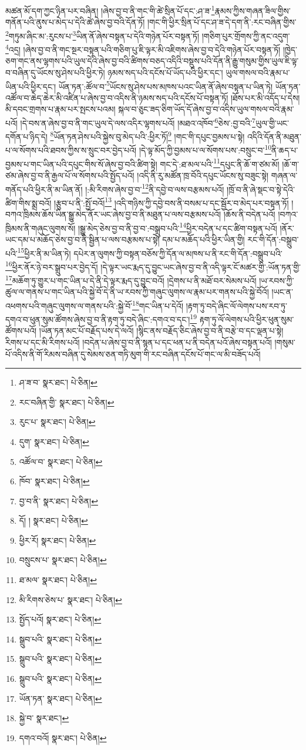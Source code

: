 མཚན་མོ་དག་ཀྱང་ཉིན་པར་བཞིན། །ཞེས་བྱ་བ་ནི་གང་གི་ཚེ་སྲིན་པོ་དང་:ཤ་ཟ་\footnote{ཤ་ཟ་བ་  སྣར་ཐང་།  པེ་ཅིན། }རྣམས་ཀྱིས་གཞན་ཟིལ་གྱིས་གནོན་པའི་ནུས་པ་མེད་པ་དེའི་ཚེ་ཞེས་བྱ་བའི་དོན་ཏོ། །གང་གི་ཕྱིར་སྲིན་པོ་དང་ཤ་ཟ་དེ་དག་ནི་:རང་བཞིན་གྱིས་\footnote{རང་བཞིན་གྱི་  སྣར་ཐང་།  པེ་ཅིན། }གཏུམ་ཞིང་མ་:རུངས་པ་\footnote{རུང་པ་  སྣར་ཐང་།  པེ་ཅིན། }ཡིན་ནོ་ཞེས་བསྟན་པ་དེའི་གཉེན་པོར་བསྟན་ཏོ། །གཅིག་པུར་གྲོགས་ཀྱི་ནང་འདུག་\footnote{དུག་  སྣར་ཐང་།  པེ་ཅིན། }འདྲ། །ཞེས་བྱ་བ་ནི་གང་སྔར་བསྟན་པའི་གཅིག་པུ་ཇི་ལྟར་མི་འཇིགས་ཞེས་བྱ་བ་དེའི་གཉེན་པོར་བསྟན་ཏོ། །ཁྱེད་ཅག་གང་ནས་ལྷགས་པའི་ཡུལ་དེའི་ཞེས་བྱ་བའི་ཚིགས་བཅད་འདིའི་བསྡུས་པའི་དོན་ནི་རྒྱུ་གསུམ་གྱིས་ཡུལ་ཇི་ལྟ་བ་བཞིན་དུ་ཡོངས་སུ་ཤེས་པའི་ཕྱིར་ཏེ། ཉམས་སད་པའི་དངོས་པོ་ཡོད་པའི་ཕྱིར་དང་། ཡུལ་གསལ་བའི་རྣམ་པ་ཡིན་པའི་ཕྱིར་དང་། ཡོན་ཏན་:ཚོལ་བ་\footnote{འཚོལ་བ་  སྣར་ཐང་།  པེ་ཅིན། }ཡོངས་སུ་ཤེས་པས་མཁས་པའང་ཡིན་ནོ་ཞེས་བསྟན་པ་ཡིན་ཏེ། ཡོན་ཏན་འཚོལ་བ་ཆེད་ཆེར་མི་འཛིན་པ་ཞེས་བྱ་བ་འདིས་ནི་ཉམས་སད་པའི་དངོས་པོ་བསྟན་ཏོ། །ཐོས་པར་མི་འདོད་པ་དེས། མི་དབང་གྲགས་པ་རྣམ་པར་སྤངས་པའམ། སྐལ་བ་ཅུང་ཟད་ཅིག་ཡོད་དོ་ཞེས་བྱ་བ་འདིས་ཡུལ་གསལ་བའི་རྣམ་པའོ། །དེ་བས་ན་ཞེས་བྱ་བ་ནི་གང་ཡུལ་དེ་ལས་འདིར་ལྷགས་པའོ། །མཐའ་འཁོབ་\footnote{ཁོབ་  སྣར་ཐང་།  པེ་ཅིན། }ཅེས་:བྱ་བའི་\footnote{བྱ་བ་ནི་  སྣར་ཐང་།  པེ་ཅིན། }ཡུལ་གྱི་ཡང་དགོན་པ་ཉིད་དེ། \footnote{དོ། །   སྣར་ཐང་།  པེ་ཅིན། }ཡོན་ཏན་ཤེས་པའི་སྐྱེས་བུ་མེད་པའི་:ཕྱིར་ཏོ།\footnote{ཕྱིར་རོ།  སྣར་ཐང་།  པེ་ཅིན། } །གང་གི་དཔུང་བྱམས་པ་སྟེ། འདིའི་དོན་ནི་མཐུན་པ་ལ་སོགས་པའི་ཐབས་ཀྱིས་ས་སྲུང་བར་བྱེད་པའོ། །དེ་ལྟ་མོད་ཀྱི་བྱམས་པ་ལ་སོགས་པས་:བསྲུང་བ་\footnote{བསྲུངས་པ་  སྣར་ཐང་།  པེ་ཅིན། }ནི་ཆད་པ་བྱམས་པ་གང་ཡིན་པའི་དཔུང་གིས་སོ་ཞེས་བྱ་བའི་ཚིག་སྟེ། གང་དེ་:ཐ་མལ་པའི་\footnote{ཐ་མལ་  སྣར་ཐང་།  པེ་ཅིན། }དཔུང་ནི་ཆོ་ག་ཙམ་མོ། །ཆོ་ག་ཙམ་ཞེས་བྱ་བ་ནི་རྒྱལ་པོ་ལ་སོགས་པའི་སྤྱོད་པའོ། །འདི་ནི་རུ་མཚོན་ཁྲ་བོའི་དཔུང་ཡོངས་སུ་བཟུང་སྟེ། གཞན་ལ་གནོད་པའི་ཕྱིར་ནི་མ་ཡིན་ནོ། །:མི་རིགས་ཞེས་བྱ་བ་\footnote{མི་རིགས་ཅེས་པ་  སྣར་ཐང་།  པེ་ཅིན། }ནི་དབྱེ་བ་ལས་བརྩམས་པའོ། །ཁྲོ་བ་ནི་ཞེ་སྡང་བ་སྟེ་དེའི་ཚིག་གིས་སྨྲ་བའོ། །རྩུབ་པ་ནི་:སྤྱོ་བའོ།\footnote{སྤྱོད་པའོ།  སྣར་ཐང་།  པེ་ཅིན། } །འདི་གཉིས་ཀྱི་དབྱེ་བས་ནི་བསམ་པ་དང་སྦྱོར་བ་མེད་པར་བསྟན་ཏོ། །བཀའ་ཁྲིམས་ཆོས་ཡིན་སྒྱུ་མེད་ནོར་ཡང་ཞེས་བྱ་བ་ནི་མཐུན་པ་ལས་བརྩམས་པའོ། །ཆོས་ནི་བདེན་པའོ། །བཀའ་ཁྲིམས་ནི་གཞུང་ལུགས་སོ། །སྒྱུ་མེད་ཅེས་བྱ་བ་ནི་བྱ་བ་:བསྒྲུབ་པའི་\footnote{སྒྲུབ་པའི་  སྣར་ཐང་།  པེ་ཅིན། }ཕྱིར་བདེན་པ་དང་ཚིག་བསྟན་པའོ། །ནོར་ཡང་དམ་པ་མཆོད་ཅེས་བྱ་བ་ནི་སྦྱིན་པ་ལས་བརྩམས་པ་སྟེ། དམ་པ་མཆོད་པའི་ཕྱིར་ཡིན་གྱི། རང་གི་དོན་:བསྒྲུབ་པའི་\footnote{སྒྲུབ་པའི་  སྣར་ཐང་།  པེ་ཅིན། }ཕྱིར་ནི་མ་ཡིན་ཏེ། དཔེར་ན་ལུགས་ཀྱི་བསྟན་བཅོས་ཀྱི་དོན་ལ་མཁས་པ་ནི་རང་གི་དོན་:བསྒྲུབ་པའི་\footnote{སྒྲུབ་པའི་  སྣར་ཐང་།  པེ་ཅིན། }ཕྱིར་ནོར་ཉེ་བར་སྒྲུབ་པར་བྱེད་དོ། །དེ་ལྟར་ཡང་རྨད་དུ་བྱུང་ཡང་ཞེས་བྱ་བ་ནི་འདི་ལྟར་ངོ་མཚར་གྱི་:ཡོན་ཏན་གྱི་\footnote{ཡོན་ཏན་  སྣར་ཐང་།  པེ་ཅིན། }མཆོག་ཏུ་གྱུར་པ་གང་ཡིན་པ་དེ་ནི་དེ་ལྟར་རྨད་དུ་བྱུང་བའོ། །དྲེགས་པ་ནི་མཐོ་བར་སེམས་པའོ། །ཡ་རབས་ཀྱི་ཚུལ་ལ་གནས་པ་གང་ཡིན་པའི་སྐྱེ་བོ་དེ་ནི་ཡ་རབས་ཀྱི་གཞུང་ལུགས་ལ་རྣམ་པར་གནས་པའི་སྐྱེ་བོའོ། །ཡང་ན་འཕགས་པའི་གཞུང་ལུགས་ལ་གནས་པའི་:སྐྱེ་བོ་\footnote{སྐྱེ་བ་  སྣར་ཐང་། }གང་ཡིན་པ་དེའོ། །རྟག་ཏུ་བདེ་ཞིང་ལོ་ལེགས་པས་རབ་ཏུ་དགའ་བ་ཕུན་སུམ་ཚོགས་ཞེས་བྱ་བ་ནི་རྟག་ཏུ་བདེ་ཞིང་:དགའ་བ་དང་།\footnote{དགའ་བའོ།  སྣར་ཐང་།  པེ་ཅིན། } རྟག་ཏུ་ལོ་ལེགས་པའི་ཕྱིར་ཕུན་སུམ་ཚོགས་པའོ། །ཡོན་ཏན་མང་པོ་བརྗོད་པས་དེ་ལའོ། །སྙིང་ནས་བརྗོད་ཅིང་ཞེས་བྱ་བ་ནི་བརྩེ་བ་དང་ལྡན་པ་སྟེ། རིགས་པ་དང་མི་རིགས་པའོ། །བདེན་པ་ཞེས་བྱ་བ་ནི་སྙན་པ་དང་ཕན་པ་ནི་བདེན་པའོ་ཞེས་བསྟན་པའོ། །གསུམ་པོ་འདིས་ནི་གོ་རིམས་བཞིན་དུ་སེམས་ཅན་གཏི་མུག་གི་རང་བཞིན་དངོས་པོ་གང་ལ་མི་བཟོད་པའོ། 